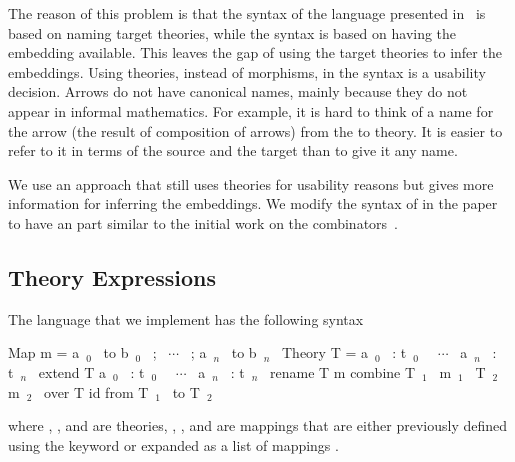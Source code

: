 The reason of this problem is that the syntax of the language presented in~\cite{carette2018building} is based on naming target theories, while the syntax is based on having the embedding available. This leaves the gap of using the target theories to infer the embeddings. Using theories, instead of morphisms, in the syntax is a usability decision. Arrows do not have canonical names, mainly because they do not appear in informal mathematics. For example, it is hard to think of a name for the arrow (the result of composition of arrows) from the  to  theory. It is easier to refer to it in terms of the source and the target than to give it any name. 

We use an approach that still uses theories for usability reasons but gives more information for inferring the embeddings. We modify the syntax of  in the paper to have an  part similar to the initial work on the combinators~\cite{CaretteOConnorTPC}. 

\begin{comment}
\subsubsection{All Paths Commute Approach} 
\ednote{@JC: Do we need to remove mixin, so all paths commute?} 
When referring to an arrow using its source and target, we implicitly assume that all paths commute, i.e.: Given the source and target, they either is no path, one path, or multiple paths that commute between them. 

In Section~\ref{sec:background:morphisms}, we discussed the three types of arrows, identity, embeddings and general morphisms. We also noted in Section~\ref{subsec:mixin} that the only combinator that accepts and generates a general morphism is \lstmath{mixin}. If we restrict our language to \lstmath{extension}, \lstmath{rename}, and \lstmath{combine}, we end up with an all-embeddings graph, in which all paths commute. 
\end{comment}

\subsection{Theory Expressions}
\label{sec:impl:expressions}
The language that we implement has the following syntax
\begin{togcode}
 Map m = {a~$_0$~ to b~$_0$~ ; ~$\cdots$~ ; a~$_n$~ to b~$_n$~}
 Theory T = {a~$_0$~ : t~$_0$~ ~$\cdots$~ a~$_n$~ : t~$_n$~}
 extend T {a~$_0$~ : t~$_0$~ ~$\cdots$~ a~$_n$~ : t~$_n$~}
 rename T m 
 combine T~$_1$~ m~$_1$~ T~$_2$~ m~$_2$~ over T
 id from T~$_1$~ to T~$_2$~
\end{togcode} 
where , , and  are theories, , , and  are mappings that are either previously defined using the  keyword or expanded as a list of mappings 
. 

